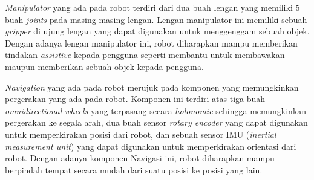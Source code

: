 \emph{Manipulator} yang ada pada robot terdiri dari dua buah lengan yang memiliki 5 buah \emph{joints} pada masing-masing lengan.
Lengan manipulator ini memiliki sebuah \emph{gripper} di ujung lengan yang dapat digunakan untuk menggenggam sebuah objek.
Dengan adanya lengan manipulator ini,
  robot diharapkan mampu memberikan tindakan \emph{assistive} kepada pengguna seperti membantu untuk membawakan maupun memberikan sebuah objek kepada pengguna.

\emph{Navigation} yang ada pada robot merujuk pada komponen yang memungkinkan pergerakan yang ada pada robot.
Komponen ini terdiri atas tiga buah \emph{omnidirectional wheels} yang terpasang secara \emph{holonomic} sehingga memungkinkan pergerakan ke segala arah,
  dua buah sensor \emph{rotary encoder} yang dapat digunakan untuk memperkirakan posisi dari robot,
  dan sebuah sensor IMU (\emph{inertial measurement unit}) yang dapat digunakan untuk memperkirakan orientasi dari robot.
Dengan adanya komponen Navigasi ini,
  robot diharapkan mampu berpindah tempat secara mudah dari suatu posisi ke posisi yang lain.
